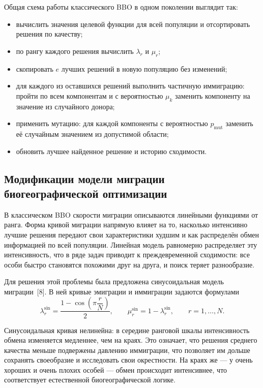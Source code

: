 \documentclass[14pt, russian]{scrartcl}
\begin{document}
Общая схема работы классического BBO в одном поколении выглядит так:
\begin{itemize}
    \item вычислить значения целевой функции для всей популяции и
    отсортировать решения по качеству;
    \item по рангу каждого решения вычислить $\lambda_r$ и $\mu_r$;
    \item скопировать $e$ лучших решений в новую популяцию без изменений;
    \item для каждого из оставшихся решений выполнить частичную
    иммиграцию: пройти по всем компонентам и с вероятностью $\mu_k$
    заменить компоненту на значение из случайного донора;
    \item применить мутацию: для каждой компоненты с вероятностью
    $p_{\text{mut}}$ заменить её случайным значением из допустимой
    области;
    \item обновить лучшее найденное решение и историю сходимости.
\end{itemize}

\subsection{Модификации модели миграции биогеографической оптимизации}

В классическом BBO скорости миграции описываются линейными функциями
от ранга. Форма кривой миграции напрямую влияет на то, насколько
интенсивно лучшие решения передают свои характеристики худшим и как
распределён обмен информацией по всей популяции. Линейная модель
равномерно распределяет эту интенсивность, что в ряде задач приводит к
преждевременной сходимости: все особи быстро становятся похожими
друг на друга, и поиск теряет разнообразие.

Для решения этой проблемы была предложена синусоидальная модель
миграции~[8]. В ней кривые эмиграции и иммиграции задаются формулами
\begin{equation}
    \lambda_r^{\text{sin}} =
        \frac{1 - \cos\!\left(\pi \dfrac{r}{N}\right)}{2},
    \qquad
    \mu_r^{\text{sin}} = 1 - \lambda_r^{\text{sin}},
    \qquad r = 1, \dots, N.
\end{equation}

Синусоидальная кривая нелинейна: в середине ранговой шкалы
интенсивность обмена изменяется медленнее, чем на краях. Это означает,
что решения среднего качества меньше подвержены давлению иммиграции,
что позволяет им дольше сохранять своеобразие и исследовать свои
окрестности. На краях же --- у очень хороших и очень плохих особей ---
обмен происходит интенсивнее, что соответствует естественной
биогеографической логике.
\end{document}

